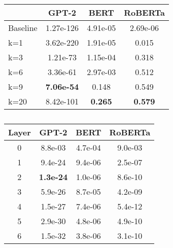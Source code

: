 \begin{table}[!htb]
    \caption{Additional isotropy analysis. In \ref{tab:k}, we report CWRs isotropy after clustering and zero-centering for different number of clusters ($k$). In \ref{tab:layers} we report per-layer isotropy.  }
    \begin{subtable}{.5\linewidth}
      \centering
        \caption{}
        \label{tab:k}
        \begin{tabular}{lccc} 
            \hline
                     & GPT-2    & BERT  & RoBERTa  \\ 
            \hline
            Baseline & 1.27e-126         & 4.91e-05       & 2.69e-06          \\ 
            \hline
            k=1      & 3.62e-220         & 1.91e-05       & 0.015             \\
            k=3      & 1.21e-73          & 1.15e-04       & 0.318             \\
            k=6      & 3.36e-61          & 2.97e-03       & 0.512             \\
            k=9      & \textbf{7.06e-54} & 0.148          & 0.549             \\
            k=20     & 8.42e-101         & \textbf{0.265} & \textbf{0.579}    \\
            \hline
        \end{tabular} 
    \end{subtable}%
    \begin{subtable}{.5\linewidth}
      \centering
        \caption{}
        \label{tab:layers}
        \begin{tabular}{c|ccc} 
            \hline
            Layer & GPT-2            & BERT             & RoBERTa           \\ 
            \hline
            0     & 8.8e-03          & 4.7e-04          & 9.0e-03           \\ 
            \hline
            1     & 9.4e-24          & 9.4e-06          & 2.5e-07           \\
            2     & \textbf{1.3e-24} & 1.0e-06          & 8.6e-10           \\
            3     & 5.9e-26          & 8.7e-05          & 4.2e-09           \\
            4     & 1.5e-27          & 7.4e-06          & 5.4e-12           \\
            5     & 2.9e-30          & 4.8e-06          & 4.9e-10           \\
            6     & 1.5e-32          & 3.8e-06          & 3.1e-10           \\

\end{tabular}
\end{subtable}
\end{table}
